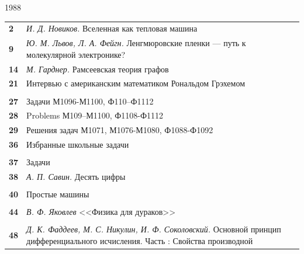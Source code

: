 \begin{minipage}[t][][b]{0.55\linewidth}

{\fontsize{20dd}{6dd}\selectfont
\hspace{20dd}1988

{\fontsize{30dd}{6dd}}
}
\vspace{1cm}

\fontsize{17dd}{6dd}\selectfont{В номере:}

\fontsize{7dd}{6dd}\selectfont
\begin{tabularx}{\linewidth}{lX}
{\bf 2} & {\itshape И. Д. Новиков.} Вселенная как тепловая машина\\
{\bf 9} & {\itshape Ю. М. Львов, Л. А. Фейгн.} Ленгмюровские пленки --- путь к молекулярной электронике?\\
{\bf 14} & {\itshape М. Гарднер.} Рамсеевская теория графов\\
{\bf 21} & {\itshape} Интервью с американским математиком Рональдом Грэхемом\\
& \vspace{1dd}{\bf Задачник <<Кванта>>}\\
{\bf 27} & Задачи М1096-М1100, Ф110--Ф1112\\
{\bf 28} & Problems М109--М1100, Ф1108-Ф1112\\
{\bf 29} & Решения задач М1071, М1076-М1080, Ф1088-Ф1092\\
{\bf 36} & Избранные школьные задачи\\
& \vspace{1dd}{\bf <<Кванта>> для младших школьников }\\
{\bf 37} & Задачи\\
{\bf 38} & {\itshape А. П. Савин.} Десять цифры\\
& \vspace{1dd}{\bf Калейдоском <<Кванта>>}\\
{\bf 40} & Простые машины\\
& \vspace{1dd}{\bf Лаборатория <<Кванта>>}\\
{\bf 44} & {\itshape В. Ф. Яковлев} <<Физика для дураков>>\\
& \vspace{1dd}{\bf Математический кружок}\\
{\bf 48} & {\itshape Д. К. Фаддеев, М. С. Никулин, И. Ф. Соколовский.} Основной принцип дифференциального исчисления. Часть  {\MakeUppercase{\romannumeral 2}}: Свойства производной\\

\end{tabularx}
\end{minipage}
